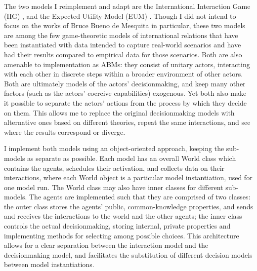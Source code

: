 The two models I reimplement and adapt are the International Interaction Game (IIG) \citep{bdm_1992,bennett_2000}, and the Expected Utility Model (EUM) \citep{bdm_1994,bdm_1997,bdm_2002}. Though I did not intend to focus on the works of Bruce Bueno de Mesquita in particular, these two models are among the few game-theoretic models of international relations that have been instantiated with data intended to capture real-world scenarios and have had their results compared to empirical data for those scenarios. Both are also amenable to implementation as ABMs: they consist of unitary actors, interacting with each other in discrete steps within a broader environment of other actors. Both are ultimately models of the actors' decisionmaking, and keep many other factors (such as the actors' coercive capabilities) exogenous. Yet both also make it possible to separate the actors' actions from the process by which they decide on them. This allows me to replace the original decisionmaking models with alternative ones based on different theories, repeat the same interactions, and see where the results correspond or diverge.

I implement both models using an object-oriented approach, keeping the sub-models as separate as possible. Each model has an overall World class which contains the agents, schedules their activation, and collects data on their interactions, where each World object is a particular model instantiation, used for one model run. The World class may also have inner classes for different sub-models. The agents are implemented such that they are comprised of two classes: the outer class stores the agents' public, common-knowledge properties, and sends and receives the interactions to the world and the other agents; the inner class controls the actual decisionmaking, storing internal, private properties and implementing methods for selecting among possible choices. This architecture allows for a clear separation between the interaction model and the decisionmaking model, and facilitates the substitution of different decision models between model instantiations.


